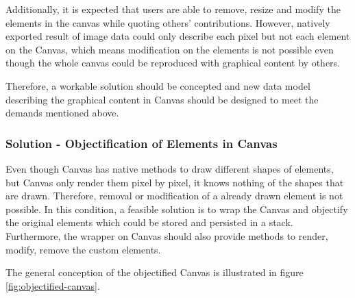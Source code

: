 Additionally, it is expected that users are able to remove, resize and modify the elements in the canvas while quoting others' contributions. However, natively exported result of image data could only describe each pixel but not each element on the Canvas, which means modification on the elements is not possible even though the whole canvas could be reproduced with graphical content by others. 

Therefore, a workable solution should be concepted and new data model describing the graphical content in Canvas should be designed to meet the demands mentioned above.

\subsubsection{Solution - Objectification of Elements in Canvas}

Even though Canvas has native methods to draw different shapes of elements, but Canvas only render them pixel by pixel, it knows nothing of the shapes that are drawn. Therefore, removal or modification of a already drawn element is not possible. In this condition, a feasible solution is to wrap the Canvas and objectify the original elements which could be stored and persisted in a stack. Furthermore, the wrapper on Canvas should also provide methods to render, modify, remove the custom elements. 

The general conception of the objectified Canvas is illustrated in figure \ref{fig:objectified-canvas}.

